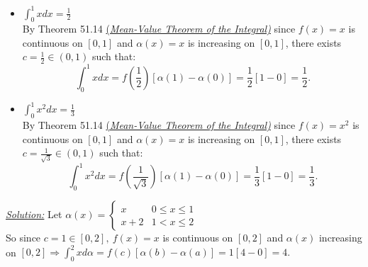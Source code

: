 \documentclass{book}
\begin{document}
\begin{tcolorbox}[enhanced,attach boxed title to top center={yshift=-3mm,yshifttext=-1mm},
colback=blue!5!white,colframe=blue!75!black,colbacktitle=red!80!black,
title=Exercise 51.6:,fonttitle=\bfseries,
boxed title style={size=small,colframe=red!50!black} ]
\begin{itemize}
\item $\int_0^1 x dx=\frac{1}{2}$\\
By Theorem 51.14 {\color{red} \underline{(\textit{Mean-Value Theorem of the 
Integral)}}} since $f(x)=x$ is continuous on $[0,1]$ and $\alpha(x)=x$ is increasing
on $[0,1]$, there exists $c=\frac{1}{2}\in(0,1)$ such that:
$$\int_0^1 x dx=f\left(\frac{1}{2}\right)[\alpha(1)-\alpha(0)]=\frac{1}{2}[1-0]=\frac{1}{2}.$$
\noindent{\color{blue}\rule{\linewidth}{.3mm}}
\item $\int_0^1 x^2 dx=\frac{1}{3}$\\
By Theorem 51.14 {\color{red} \underline{(\textit{Mean-Value Theorem of the 
Integral)}}} since $f(x)=x^2$ is continuous on $[0,1]$ and $\alpha(x)=x$ is 
increasing on $[0,1]$, there exists $c=\frac{1}{\sqrt{3}}\in(0,1)$ such that:
$$\int_0^1 x^2 dx=f\left(\frac{1}{\sqrt{3}}\right)[\alpha(1)-\alpha(0)]=\frac{1}{3}[1-0]=\frac{1}{3}.$$

\end{itemize}
\end{tcolorbox}
\begin{tcolorbox}[enhanced,attach boxed title to top center={yshift=-3mm,yshifttext=-1mm},
colback=blue!5!white,colframe=blue!75!black,colbacktitle=red!80!black,
title=Exercise 51.7:,fonttitle=\bfseries,
boxed title style={size=small,colframe=red!50!black} ]
\textit{\color{blue}\underline{Solution:}}
Let $\alpha(x)=\begin{cases}
x & 0\leq x\leq 1\\
x+2 & 1<x\leq 2
\end{cases}$\\
So since $c=1\in[0,2],~f(x)=x$ is continuous on 
$[0,2]$ and $\alpha(x)$ increasing on $[0,2]\Rightarrow\int_0^2 xd\alpha=f(c)[\alpha(b)-\alpha(a)]=1[4-0]=4.$\\

\end{tcolorbox}
\end{document}
